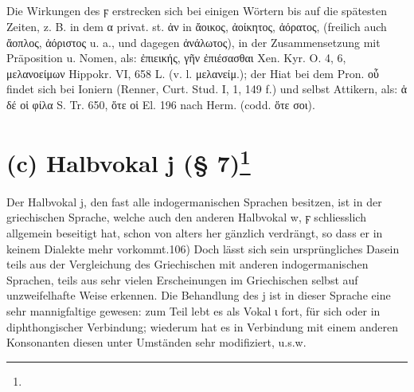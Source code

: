 {\small\noindent\subparagraph{} Die Wirkungen des ϝ erstrecken sich bei einigen
  Wörtern bis auf die spätesten Zeiten, z. B. in dem α privat. st. ἀν in ἄοικος,
  ἀοίκητος, ἀόρατος, (freilich auch ἄοπλος, ἀόριστος u. a., und dagegen
  ἀνάλωτος), in der Zusammensetzung mit Präposition u. Nomen, als: ἐπιεικής, γῆν
  ἐπιέσασθαι Xen. Kyr. O. 4, 6, μελανοείμων Hippokr. VI, 658 L. (v. l.
  μελανείμ.); der Hiat bei dem Pron. οὗ findet sich bei Ioniern (Renner, Curt.
  Stud. I, 1, 149 f.) und selbst Attikern, als: ἁ δέ οἱ φίλα S. Tr. 650, ὅτε οἱ
El. 196 nach Herm. (codd. ὅτε σοι).}

\section[(c) Halbvokal j (§ 7)]{(c) Halbvokal j (§ 7)\protect\footnote{}}

\paragraph{} Der Halbvokal j, den fast alle indogermanischen Sprachen besitzen,
ist in der griechischen Sprache, welche auch den anderen Halbvokal w, ϝ
schliesslich allgemein beseitigt hat, schon von alters her gänzlich verdrängt,
so dass er in keinem Dialekte mehr vorkommt.106) Doch lässt sich sein
ursprüngliches Dasein teils aus der Vergleichung des Griechischen mit anderen
indogermanischen Sprachen, teils aus sehr vielen Erscheinungen im Griechischen
selbst auf unzweifelhafte Weise erkennen. Die Behandlung des j ist in dieser
Sprache eine sehr mannigfaltige gewesen: zum Teil lebt es als Vokal ι fort, für
sich oder in diphthongischer Verbindung; wiederum hat es in Verbindung mit einem
anderen Konsonanten diesen unter Umständen sehr modifiziert, u.s.w. 

